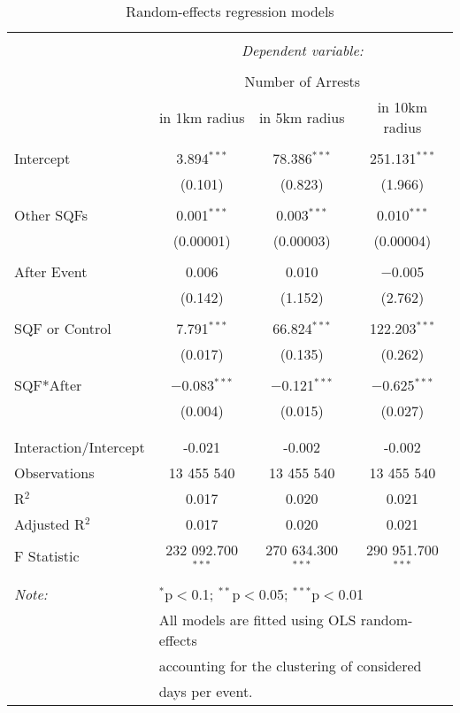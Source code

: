 
\begin{table}[!htbp] \centering 
  \caption{Random-effects regression models} 
  \label{} 
\footnotesize 
\begin{tabular}{@{\extracolsep{4pt}}lccc} 
\\[-1.8ex]\hline 
\hline \\[-1.8ex] 
 & \multicolumn{3}{c}{\textit{Dependent variable:}} \\ 
\cline{2-4} 
\\[-1.8ex] & \multicolumn{3}{c}{Number of Arrests \vspace*{0.2cm}} \\ 
 & in 1km radius & in 5km radius & in 10km radius \\ 
\hline \\[-1.8ex] 
 Intercept & 3.894$^{***}$ & 78.386$^{***}$ & 251.131$^{***}$ \\ 
  & (0.101) & (0.823) & (1.966) \\ 
  & & & \\ 
 Other SQFs & 0.001$^{***}$ & 0.003$^{***}$ & 0.010$^{***}$ \\ 
  & (0.00001) & (0.00003) & (0.00004) \\ 
  & & & \\ 
 After Event & 0.006 & 0.010 & $-$0.005 \\ 
  & (0.142) & (1.152) & (2.762) \\ 
  & & & \\ 
 SQF or Control & 7.791$^{***}$ & 66.824$^{***}$ & 122.203$^{***}$ \\ 
  & (0.017) & (0.135) & (0.262) \\ 
  & & & \\ 
 SQF*After & $-$0.083$^{***}$ & $-$0.121$^{***}$ & $-$0.625$^{***}$ \\ 
  & (0.004) & (0.015) & (0.027) \\ 
  & & & \\ 
\hline \\[-1.8ex] 
Interaction/Intercept & -0.021 & -0.002 & -0.002 \\ 
Observations & 13 455 540 & 13 455 540 & 13 455 540 \\ 
R$^{2}$ & 0.017 & 0.020 & 0.021 \\ 
Adjusted R$^{2}$ & 0.017 & 0.020 & 0.021 \\ 
F Statistic & 232 092.700$^{***}$ & 270 634.300$^{***}$ & 290 951.700$^{***}$ \\ 
\hline 
\hline \\[-1.8ex] 
\textit{Note:}  & \multicolumn{3}{l}{$^{*}$p$<$0.1; $^{**}$p$<$0.05; $^{***}$p$<$0.01} \\ 
 & \multicolumn{3}{l}{All models are fitted using OLS random-effects} \\ 
 & \multicolumn{3}{l}{accounting for the clustering of considered} \\ 
 & \multicolumn{3}{l}{days per event.} \\ 
\end{tabular} 
\end{table} 
